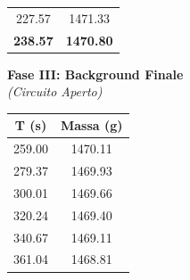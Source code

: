 \documentclass[a4paper,12pt]{article}
\begin{document}
\begin{table}[H]
\begin{minipage}[t]{0.33\textwidth}
\begin{tabular}{cc}
227.57 & 1471.33 \\
\textbf{238.57} & \textbf{1470.80} \\
\bottomrule
\end{tabular}
\end{minipage}
\hfill
\begin{minipage}[t]{0.31\textwidth}
\centering
\textbf{Fase III: Background Finale} \\
\textit{(Circuito Aperto)} \\
\vspace{0.2cm}
\begin{tabular}{cc}
\toprule
\textbf{T (s)} & \textbf{Massa (g)} \\
\midrule
259.00 & 1470.11 \\
279.37 & 1469.93 \\
300.01 & 1469.66 \\
320.24 & 1469.40 \\
340.67 & 1469.11 \\
361.04 & 1468.81 \\
\bottomrule
\end{tabular}
\end{minipage}

\end{table}
\end{document}
